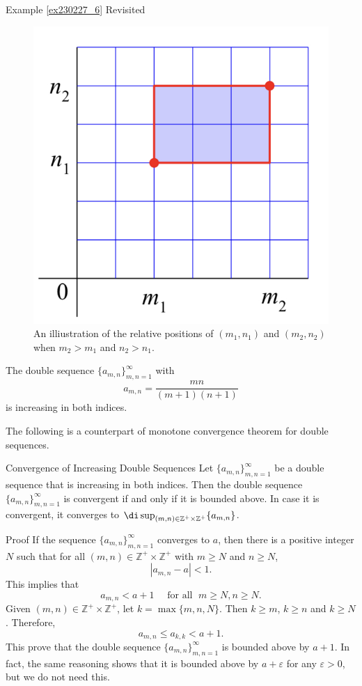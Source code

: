 \begin{example}{\linkt Example \ref{ex230227_6} Revisited}
\begin{example}[label=ex230227_13]{}
\begin{example}{}
\begin{figure}[ht]
\centering
\includegraphics[scale=0.2]{Picture51.png}
\caption{An illiustration of the relative positions of $(m_1,n_1)$ and $(m_2, n_2)$ when $m_2>m_1$ and $n_2>n_1$.\fa}\label{figure51}
\end{figure}

 \begin{example}{}
The double sequence $\{a_{m,n}\}_{m,n=1}^{\infty}$ with
\[a_{m,n}=\frac{mn}{(m+1)(n+1)}\] is increasing in both indices.
\end{example}

The following is a counterpart of monotone convergence theorem for double sequences. 
 
\begin{theorem}[label=230301_11]
{Convergence of Increasing Double Sequences}
Let $\{a_{m,n}\}_{m,n=1}^{\infty}$ be a double sequence that is increasing in both indices. Then the double sequence $\{a_{m,n}\}_{m,n=1}^{\infty}$ is convergent if and only if it is bounded above. In case it is convergent, it converges to $\di\sup_{(m,n)\in\mathbb{Z}^+\times\mathbb{Z}^+}\{a_{m,n}\}$.
\end{theorem}
\begin{myproof}{Proof}
If the sequence $\{a_{m,n}\}_{m,n=1}^{\infty}$ converges to $a$, then there is a positive integer $N$ such that for all $(m,n)\in\mathbb{Z}^+\times\mathbb{Z}^+$ with $m\geq N$ and $n\geq N$, 
\[|a_{m,n}-a|<1.\]
This implies that 
\[a_{m,n}<a+1 \quad \text{ for all }\; m\geq N, n\geq N.\]Given $(m,n)\in\mathbb{Z}^+\times \mathbb{Z}^+$, let $k=\max\{m,n,N\}$. Then $k\geq m$, $k \geq n$ and $k\geq N$. Therefore,
\[a_{m,n}\leq  a_{k,k}<a+1.\]\bp
This prove  that the double sequence $\{a_{m,n}\}_{m,n=1}^{\infty}$ is bounded above by $a+1$.
In fact, the same reasoning shows that it is bounded above by $a+\varepsilon$ for any $\varepsilon>0$, but we do not need this.
 

\end{myproof}
\end{example}
\end{example}
\end{example}

